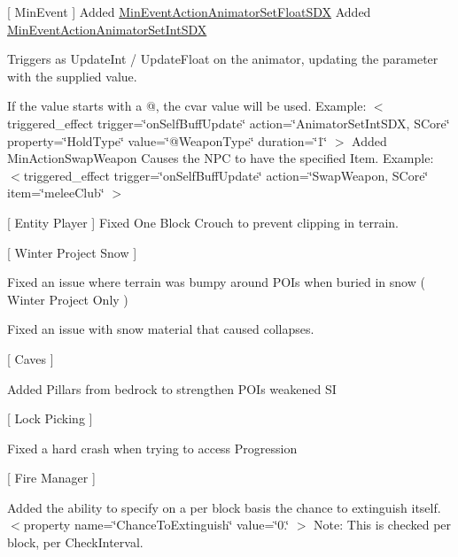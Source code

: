\mbox{[} Min\+Event \mbox{]} Added \mbox{\hyperlink{class_min_event_action_animator_set_float_s_d_x}{Min\+Event\+Action\+Animator\+Set\+Float\+SDX}} Added \mbox{\hyperlink{class_min_event_action_animator_set_int_s_d_x}{Min\+Event\+Action\+Animator\+Set\+Int\+SDX}}
\begin{DoxyItemize}
\item Triggers as Update\+Int / Update\+Float on the animator, updating the parameter with the supplied value.
\item If the value starts with a @, the cvar value will be used. Example\+: $<$triggered\+\_\+effect trigger=\char`\"{}on\+Self\+Buff\+Update\char`\"{} action=\char`\"{}\+Animator\+Set\+Int\+SDX, SCore\char`\"{} property=\char`\"{}\+Hold\+Type\char`\"{} value=\char`\"{}@\+Weapon\+Type\char`\"{} duration=\char`\"{}1\char`\"{} $>$ Added Min\+Action\+Swap\+Weapon Causes the NPC to have the specified Item. Example\+: $<$triggered\+\_\+effect trigger=\char`\"{}on\+Self\+Buff\+Update\char`\"{} action=\char`\"{}\+Swap\+Weapon, SCore\char`\"{} item=\char`\"{}melee\+Club\char`\"{} $>$
\end{DoxyItemize}

\mbox{[} Entity Player \mbox{]} Fixed One Block Crouch to prevent clipping in terrain.

\mbox{[} Winter Project Snow \mbox{]}
\begin{DoxyItemize}
\item Fixed an issue where terrain was bumpy around POIs when buried in snow ( Winter Project Only )
\item Fixed an issue with snow material that caused collapses.
\end{DoxyItemize}

\mbox{[} Caves \mbox{]}
\begin{DoxyItemize}
\item Added Pillars from bedrock to strengthen POIs weakened SI
\end{DoxyItemize}

\mbox{[} Lock Picking \mbox{]}
\begin{DoxyItemize}
\item Fixed a hard crash when trying to access Progression
\end{DoxyItemize}

\mbox{[} Fire Manager \mbox{]}
\begin{DoxyItemize}
\item Added the ability to specify on a per block basis the chance to extinguish itself. $<$property name=\char`\"{}\+Chance\+To\+Extinguish\char`\"{} value=\char`\"{}0.\char`\"{} $>$ Note\+: This is checked per block, per Check\+Interval.
\end{DoxyItemize}

